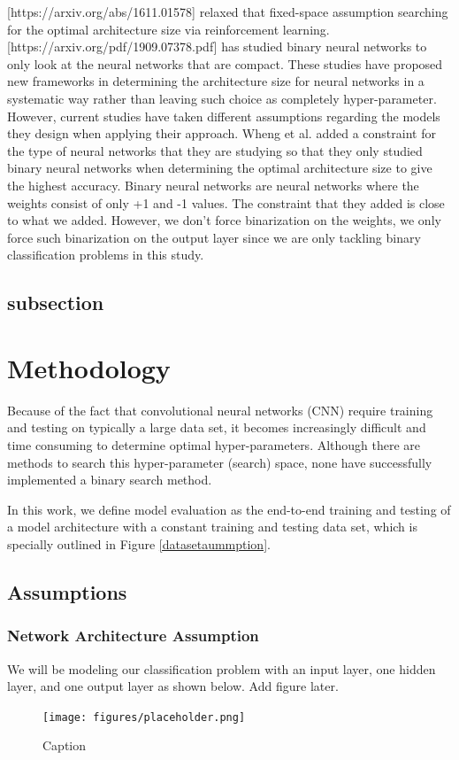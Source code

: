 \documentclass[runningheads]{llncs}
\begin{document}
[https://arxiv.org/abs/1611.01578] relaxed that fixed-space assumption searching for the optimal architecture size via reinforcement learning. [https://arxiv.org/pdf/1909.07378.pdf] has studied binary neural networks to only look at the neural networks that are compact. These studies have proposed new frameworks in determining the architecture size for neural networks in a systematic way rather than leaving such choice as completely hyper-parameter. However, current studies have taken different assumptions regarding the models they design when applying their approach. Wheng et al. added a constraint for the type of neural networks that they are studying so that they only studied binary neural networks when determining the optimal architecture size to give the highest accuracy. Binary neural networks are neural networks where the weights consist of only +1 and -1 values.
The constraint that they added is close to what we added. However, we don't force binarization on the weights, we only force such binarization on the output layer since we are only tackling binary classification problems in this study.

 

\subsection{subsection}


\section{Methodology}

Because of the fact that convolutional neural networks (CNN) require training and testing on typically a large data set, it becomes increasingly difficult and time consuming to determine optimal hyper-parameters. Although there are methods to search this hyper-parameter (search) space, none have successfully implemented a binary search method. 

In this work, we define model evaluation as the end-to-end training and testing of a model architecture with a constant training and testing data set, which is specially outlined in Figure \autoref{datasetaummption}. 



\subsection{Assumptions}


\subsubsection{Network Architecture Assumption}
We will be modeling our classification problem with an input layer, one hidden layer, and one output layer as shown below.
Add figure later.
\begin{figure}[H]
    \centering
    \texttt{[image: figures/placeholder.png]}
    \caption{Caption}
    \label{fig:my_label}
\end{figure}
\end{document}

